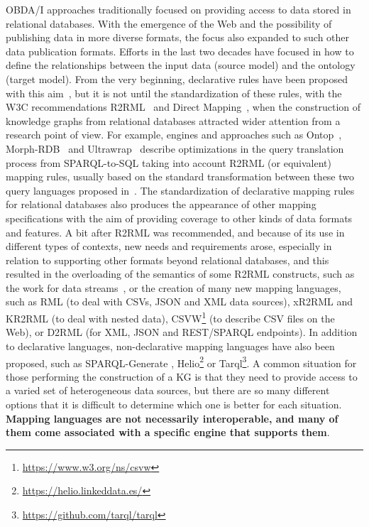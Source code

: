 OBDA/I approaches traditionally focused on providing access to data stored in relational databases. With the emergence of the Web and the possibility of publishing data in more diverse formats, the focus also expanded to such other data publication formats. Efforts in the last two decades have focused in how to define the relationships between the input data (source model) and the ontology (target model). From the very beginning, declarative rules have been proposed with this aim~\citep{barrasa2004r2o,bizer2004d2rq,auer2009triplify}, but it is not until the standardization of these rules, with the W3C recommendations R2RML~\citep{R2RML} and Direct Mapping~\citep{arenas2013direct}, when the construction of knowledge graphs from relational databases attracted wider attention from a research point of view. For example, engines and approaches such as Ontop~\citep{calvanese2017ontop}, Morph-RDB~\citep{priyatna2014formalisation} and Ultrawrap~\citep{sequeda2013ultrawrap} describe optimizations in the query translation process from SPARQL-to-SQL taking into account R2RML (or equivalent) mapping rules, usually based on the standard transformation between these two query languages proposed in~\citep{chebotko2009semantics, elliott2009complete}. The standardization of declarative mapping rules for relational databases also produces the appearance of other mapping specifications with the aim of providing coverage to other kinds of data formats and features. A bit after R2RML was recommended, and because of its use in different types of contexts, new needs and requirements arose, especially in relation to supporting other formats beyond relational databases, and this resulted in the overloading of the semantics of some R2RML constructs, such as the work for data streams~\citep{calbimonte2010enabling}, or the creation of many new mapping languages, such as RML \citep{dimou2014rml} (to deal with CSVs, JSON and XML data sources), xR2RML \citep{michel2015translation} and  KR2RML \citep{slepicka2015kr2rml} (to deal with nested data), CSVW\footnote{\url{https://www.w3.org/ns/csvw}} (to describe CSV files on the Web), or D2RML \citep{chortaras2018d2rml} (for XML, JSON and REST/SPARQL endpoints). In addition to declarative languages, non-declarative mapping languages have also been proposed, such as SPARQL-Generate \citep{lefranccois2017sparql}, Helio\footnote{\url{https://helio.linkeddata.es/}} or  Tarql\footnote{\url{https://github.com/tarql/tarql}}. A common situation for those performing the construction of a KG is that they need to provide access to a varied set of heterogeneous data sources, but there are so many different options that it is difficult to determine which one is better for each situation. \textbf{Mapping languages are not necessarily interoperable, and many of them come associated with a specific engine that supports them}.

